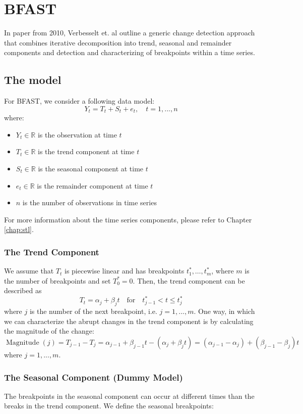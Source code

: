 \documentclass[main.tex]{subfiles}
\begin{document}
\chapter{BFAST}
\label{chap:bfast}
In paper from 2010, Verbesselt et. al \cite{bfast} outline a generic change detection approach
that combines iterative decomposition into trend, seasonal and remainder components and detection
and characterizing of breakpoints within a time series. 

\section{The model}
\label{sec:bfast_the_model}
For BFAST, we consider a following data model:
\[
Y_t = T_t + S_t + e_t, \quad t = 1,...,n
\]
where:
\begin{itemize}
\item $Y_t \in \mathbb{R}$ is the observation at time $t$
\item $T_t \in \mathbb{R}$ is the trend component at time $t$
\item $S_t \in \mathbb{R}$ is the seasonal component at time $t$
\item $e_t \in \mathbb{R}$ is the remainder component at time $t$
\item $n$ is the number of observations in time series
\end{itemize}
For more information about the time series components, please refer to Chapter
\ref{chap:stl}.
\subsection{The Trend Component}
\label{subsec:trend}
We assume that $T_t$ is piecewise linear and has breakpoints $t_1^*,\hdots, t_m^*$,
where $m$ is the number of breakpoints and set $T_0^* = 0$. Then, the trend component
can be described as
\[
T_t = \alpha_j + \beta_j t \quad \text{for}\quad t^*_{j-1}<t\leq t_j^*
\]
where $j$ is the number of the next breakpoint, i.e. $j = 1,...,m$. One way, in
which we can characterize the abrupt changes in the trend component is by
calculating the magnitude of the change:
\[
\operatorname{Magnitude}(j) = T_{j-1} - T_{j} = \alpha_{j-1} + \beta_{j-1} t -
(\alpha_j + \beta_j t) = (\alpha_{j-1} - \alpha_j) + (\beta_{j-1} - \beta_j)t
\]
where $j = 1,...,m$.

\subsection{The Seasonal Component (Dummy Model)}
\label{subsec:seasonal_dummy}
The breakpoints in the seasonal component can occur at different times than the
breaks in the trend component. We define the seasonal breakpoints:
\end{document}
